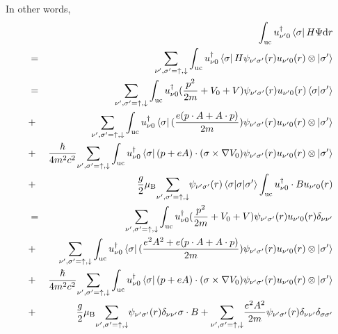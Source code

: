 \documentclass{article}
\begin{document}
In other words,
\begin{eqnarray*}
    &&\int_{\text{{uc}}}u_{\nu'0}^{\dagger}\bra{\sigma}H\Psi\text{{d}}r\\&=&\underset{\nu',\sigma'=\uparrow,\downarrow}{\sum}\int_{\text{{uc}}}u_{\nu0}^{\dagger}\bra{\sigma}H\psi_{\nu'\sigma'}(r)u_{\nu'0}(r)\otimes\ket{\sigma'}\\&=&\underset{\nu',\sigma'=\uparrow,\downarrow}{\sum}\int_{\text{{uc}}}u_{\nu0}^{\dagger}(\frac{p^{2}}{2m}+V_{0}+V)\psi_{\nu'\sigma'}(r)u_{\nu'0}(r)\braket{\sigma|\sigma'}\\&+&\underset{\nu',\sigma'=\uparrow,\downarrow}{\sum}\int_{\text{{uc}}}u_{\nu0}^{\dagger}\bra{\sigma}(\frac{e(p\cdot A+A\cdot p)}{2m})\psi_{\nu'\sigma'}(r)u_{\nu'0}(r)\otimes\ket{\sigma'}\\&+&\frac{\hbar}{4m^{2}c^{2}}\underset{\nu',\sigma'=\uparrow,\downarrow}{\sum}\int_{\text{{uc}}}u_{\nu0}^{\dagger}\bra{\sigma}(p+eA)\cdot(\sigma\times\nabla V_{0})\psi_{\nu'\sigma'}(r)u_{\nu'0}(r)\otimes\ket{\sigma'}\\&+&\frac{g}{2}\mu_{\text{B}}\underset{\nu',\sigma'=\uparrow,\downarrow}{\sum}\psi_{\nu'\sigma'}(r)\braket{\sigma|\sigma|\sigma'}\int_{\text{{uc}}}u_{\nu0}^{\dagger}\cdot Bu_{\nu'0}(r)\\&=&\underset{\nu',\sigma'=\uparrow,\downarrow}{\sum}\int_{\text{{uc}}}u_{\nu0}^{\dagger}(\frac{p^{2}}{2m}+V_{0}+V)\psi_{\nu'\sigma'}(r)u_{\nu'0}(r)\delta_{\nu\nu'}\\&+&\underset{\nu',\sigma'=\uparrow,\downarrow}{\sum}\int_{\text{{uc}}}u_{\nu0}^{\dagger}\bra{\sigma}(\frac{e^{2}A^{2}+e(p\cdot A+A\cdot p)}{2m})\psi_{\nu'\sigma'}(r)u_{\nu'0}(r)\otimes\ket{\sigma'}\\&+&\frac{\hbar}{4m^{2}c^{2}}\underset{\nu',\sigma'=\uparrow,\downarrow}{\sum}\int_{\text{{uc}}}u_{\nu0}^{\dagger}\bra{\sigma}(p+eA)\cdot(\sigma\times\nabla V_{0})\psi_{\nu'\sigma'}(r)u_{\nu'0}(r)\otimes\ket{\sigma'}\\&+&\frac{g}{2}\mu_{\text{B}}\underset{\nu',\sigma'=\uparrow,\downarrow}{\sum}\psi_{\nu'\sigma'}(r)\delta_{\nu\nu'}\sigma\cdot B+\underset{\nu',\sigma'=\uparrow,\downarrow}{\sum}\frac{e^{2}A^{2}}{2m}\psi_{\nu'\sigma'}(r)\delta_{\nu\nu'}\delta_{\sigma\sigma'}
\end{eqnarray*}
\end{document}
